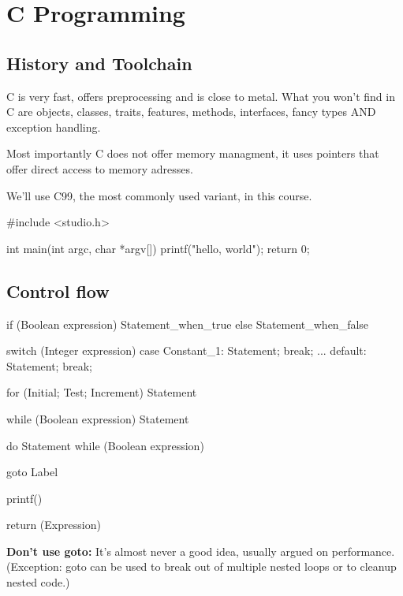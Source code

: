 \section{C Programming}

\subsection{History and Toolchain}

C is very fast, offers preprocessing and is close to metal. What you won't find in C are objects, classes, traits, features, methods, interfaces, fancy types AND exception handling.

\begin{important}
    Most importantly C does not offer memory managment, it uses pointers that offer direct access to memory adresses.
\end{important}

We'll use C99, the most commonly used variant, in this course.

\begin{codeexample}
#include <studio.h>

int main(int argc, char *argv[])
{
    printf("hello, world\n");
    return 0;
}
\end{codeexample}

\subsection{Control flow}

\begin{codeexample}
if (Boolean expression) Statement_when_true
    else Statement_when_false

switch (Integer expression) {
    case Constant_1: Statement; break;
    ...
    default: Statement; break;
}

for (Initial; Test; Increment) Statement

while (Boolean expression) Statement

do Statement while (Boolean expression)

goto Label

printf()

return (Expression)
\end{codeexample}

\begin{important}
    \textbf{Don't use goto:} It's almost never a good idea, usually argued on performance. (Exception: goto can be used to break out of multiple nested loops or to cleanup nested code.)
\end{important}

